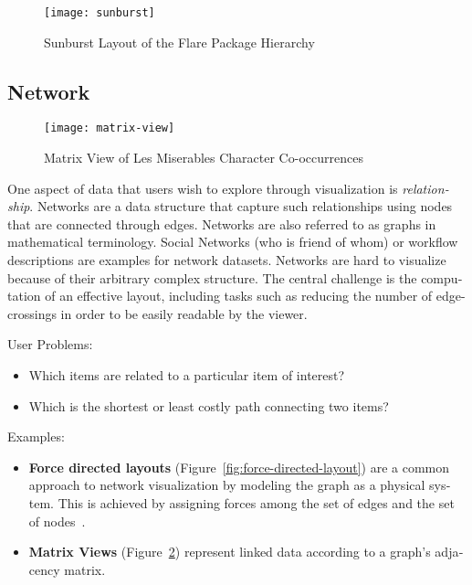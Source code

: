 \begin{english}
\begin{figure}
\centering
\texttt{[image: sunburst]}
\caption{Sunburst Layout of the Flare Package Hierarchy}
\label{fig:sunburst}
\end{figure}


\subsection{Network}

\begin{figure}
\centering
\texttt{[image: matrix-view]}
\caption{Matrix View of Les Miserables Character Co-occurrences}
\label{fig:matrix-view}
\end{figure}

One aspect of data that users wish to explore through visualization is \emph{relationship}. Networks are a data structure that capture such relationships using nodes that are connected through edges. Networks are also referred to as graphs in mathematical terminology. Social Networks (who is friend of whom) or workflow descriptions are examples for network datasets. Networks are hard to visualize because of their arbitrary complex structure. The central challenge is the computation of an effective layout, including tasks such as reducing the number of edge-crossings in order to be easily readable by the viewer.

\SuperPar User Problems:

\begin{itemize}
\item Which items are related to a particular item of interest?
\item Which is the shortest or least costly path connecting two items?
\end{itemize}


\SuperPar Examples:

\begin{itemize}
\item \textbf{Force directed layouts} (Figure~\ref{fig:force-directed-layout}) are a common approach to network visualization by modeling the graph as a physical system. This is achieved by assigning forces among the set of edges and the set of nodes~\cite{VisualizationZoo:2010}.
\item \textbf{Matrix Views} (Figure~\ref{fig:matrix-view}) represent linked data according to a graph's adjacency matrix.
\end{itemize}


\end{english}
